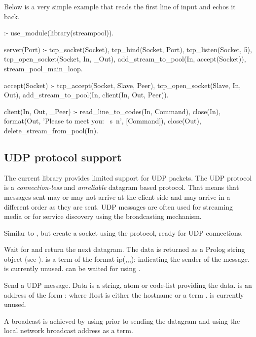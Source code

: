 \documentclass[11pt]{article}
\begin{document}
Below is a very simple example that reads the first line of input and
echos it back.

\begin{code}
:- use_module(library(streampool)).

server(Port) :-
        tcp_socket(Socket),
        tcp_bind(Socket, Port),
        tcp_listen(Socket, 5),
        tcp_open_socket(Socket, In, _Out),
        add_stream_to_pool(In, accept(Socket)),
        stream_pool_main_loop.

accept(Socket) :-
        tcp_accept(Socket, Slave, Peer),
        tcp_open_socket(Slave, In, Out),
        add_stream_to_pool(In, client(In, Out, Peer)).

client(In, Out, _Peer) :-
        read_line_to_codes(In, Command),
        close(In),
        format(Out, 'Please to meet you: ~s~n', [Command]),
        close(Out),
        delete_stream_from_pool(In).
\end{code}

\noindent
\subsection{UDP protocol support}

The current library provides limited support for UDP packets. The UDP
protocol is a \emph{connection-less} and \emph{unreliable} datagram
based protocol. That means that messages sent may or may not arrive at
the client side and may arrive in a different order as they are sent.
UDP messages are often used for streaming media or for service discovery
using the broadcasting mechanism.

\begin{description}
Similar to , but create a socket using the 
protocol, ready for UDP connections.

Wait for and return the next datagram. The data is returned as a
Prolog string object (see ).  is a term of the
format \mbox{ip(,,,):} indicating
the sender of the message.  is currently unused.
 can be waited for using .

Send a UDP message.  Data is a string, atom or code-list providing the
data.   is an address of the form : where
Host is either the hostname or a term .   is currently unused.

A broadcast is achieved by using 
prior to sending the datagram and using the local network broadcast
address as a  term.
\end{description}
\end{document}
